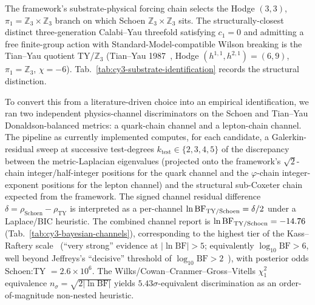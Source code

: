 ﻿\documentclass[reprint,amsmath,amssymb,aps,prd,longbibliography,floatfix]{revtex4-2}
\begin{document}
The framework's substrate-physical forcing chain selects the Hodge $(3,3)$, $\pi_1 = \mathbb{Z}_3 \times \mathbb{Z}_3$ branch on which Schoen $\mathbb{Z}_3 \times \mathbb{Z}_3$ sits. The structurally-closest distinct three-generation Calabi--Yau threefold satisfying $c_1 = 0$ and admitting a free finite-group action with Standard-Model-compatible Wilson breaking is the Tian--Yau quotient TY/$\mathbb{Z}_3$ (Tian--Yau 1987~\cite{TianYau1987}, Hodge $(h^{1,1}, h^{2,1}) = (6,9)$, $\pi_1 = \mathbb{Z}_3$, $\chi = -6$). Tab.~\ref{tab:cy3-substrate-identification} records the structural distinction.

To convert this from a literature-driven choice into an empirical identification, we ran two independent physics-channel discriminators on the Schoen and Tian--Yau Donaldson-balanced metrics: a quark-chain channel and a lepton-chain channel. The pipeline as currently implemented computes, for each candidate, a Galerkin-residual sweep at successive test-degrees $k_\mathrm{test} \in \{2,3,4,5\}$ of the discrepancy between the metric-Laplacian eigenvalues (projected onto the framework's $\sqrt{2}$-chain integer/half-integer positions for the quark channel and the $\varphi$-chain integer-exponent positions for the lepton channel) and the structural sub-Coxeter chain expected from the framework. The signed channel residual difference $\delta = \rho_\mathrm{Schoen} - \rho_\mathrm{TY}$ is interpreted as a per-channel $\ln \mathrm{BF}_{\rm TY/Schoen} = \delta/2$ under a Laplace/BIC heuristic. The combined channel report is $\ln \mathrm{BF}_{\rm TY/Schoen} = -14.76$ (Tab.~\ref{tab:cy3-bayesian-channels}), corresponding to the highest tier of the Kass--Raftery scale~\cite{KassRaftery1995} (``very strong'' evidence at $|\ln \mathrm{BF}|>5$; equivalently $\log_{10} \mathrm{BF} > 6$, well beyond Jeffreys's ``decisive'' threshold of $\log_{10} \mathrm{BF} > 2$~\cite{Jeffreys1961}), with posterior odds Schoen:TY $= 2.6 \times 10^6$. The Wilks/Cowan--Cranmer--Gross--Vitells $\chi^2_1$ equivalence $n_\sigma = \sqrt{2|\ln \mathrm{BF}|}$ yields $5.43\sigma$-equivalent discrimination as an order-of-magnitude non-nested heuristic.
\end{document}

